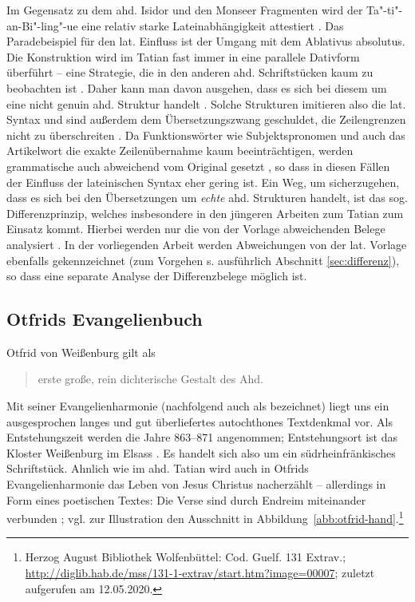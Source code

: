 Im Gegensatz zu dem ahd. Isidor und den Monseer Fragmenten wird der Ta"-ti"-an-Bi"-ling"-ue eine relativ starke Lateinabhängigkeit attestiert \parencites(){Lippert1974}[128]{Sonderegger2003}. Das Paradebeispiel für den lat. Einfluss ist der Umgang mit dem Ablativus absolutus. Die Konstruktion wird im Tatian fast immer in eine parallele Dativform überführt -- eine Strategie, die in den anderen ahd. Schriftstücken kaum zu beobachten ist \parencite[145f]{Lippert1974}. Daher kann man davon ausgehen, dass es sich bei diesem  um eine nicht genuin ahd. Struktur handelt \parencite[zur vertiefenden Diskussion s.][39--40]{Fleischer2011}. Solche Strukturen imitieren also die lat. Syntax und sind außerdem dem Übersetzungszwang geschuldet, die Zeilengrenzen nicht zu überschreiten \parencite[136]{Masser1997}. Da Funktionswörter wie Subjektspronomen  und auch das Artikelwort  die exakte Zeilenübernahme kaum beeinträchtigen, werden grammatische  \parencite[43]{Fleischer2011} auch abweichend vom Original gesetzt \parencites[vgl. auch][20]{Dittmer1998}, so dass in diesen Fällen der Einfluss der lateinischen Syntax eher gering ist.  
Ein Weg, um sicherzugehen, dass es sich bei den Übersetzungen um \textit{echte} ahd. Strukturen handelt, ist das sog. Differenzprinzip, welches insbesondere in den jüngeren Arbeiten zum Tatian zum Einsatz kommt. Hierbei werden nur die von der Vorlage abweichenden Belege analysiert \parencite{Dittmer1998,Hinterholzl2005,Fleischer2008}. In der vorliegenden Arbeit werden Abweichungen von der lat. Vorlage ebenfalls gekennzeichnet (zum Vorgehen s. ausführlich Abschnitt \ref{sec:differenz}), so dass eine separate Analyse der Differenzbelege  möglich ist.  


\subsection{Otfrids Evangelienbuch}

Otfrid von Weißenburg gilt als \blockcquote[146]{Sonderegger2003}{erste große, rein dichterische Gestalt des Ahd.}. Mit seiner Evangelienharmonie (nachfolgend auch als  bezeichnet) liegt uns ein ausgesprochen langes und gut überliefertes autochthones Textdenkmal vor. Als Entstehungszeit werden die Jahre 863--871 angenommen; Entstehungsort ist das Kloster Weißenburg im Elsass \parencite[50]{Fleischer2011}. Es handelt sich also um ein südrheinfränkisches Schriftstück. Ahnlich wie im ahd. Tatian wird auch in Otfrids Evangelienharmonie das Leben von Jesus Christus nacherzählt -- allerdings in Form eines poetischen Textes: Die Verse sind durch Endreim  miteinander verbunden   \parencite[zu Variationen im Versmaß s. ausführlich][148--150] {Sonderegger2003}; vgl. zur Illustration den Ausschnitt in Abbildung~\ref{abb:otfrid-hand}.\footnote{Herzog August Bibliothek Wolfenbüttel: Cod. Guelf. 131 Extrav.; \url{http://diglib.hab.de/mss/131-1-extrav/start.htm?image=00007}; zuletzt aufgerufen am 12.05.2020.}


